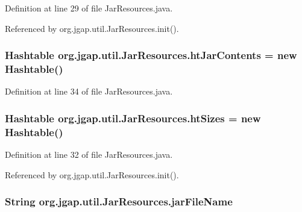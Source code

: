 Definition at line 29 of file Jar\-Resources.\-java.



Referenced by org.\-jgap.\-util.\-Jar\-Resources.\-init().

\hypertarget{classorg_1_1jgap_1_1util_1_1_jar_resources_a49a4dfbb28f5a8d1ce4aebf4e2d93b84}{
\subsubsection[{ht\-Jar\-Contents}]{\setlength{\rightskip}{0pt plus 5cm}Hashtable org.\-jgap.\-util.\-Jar\-Resources.\-ht\-Jar\-Contents = new Hashtable()\hspace{0.3cm}{\ttfamily [private]}}}\label{classorg_1_1jgap_1_1util_1_1_jar_resources_a49a4dfbb28f5a8d1ce4aebf4e2d93b84}


Definition at line 34 of file Jar\-Resources.\-java.

\hypertarget{classorg_1_1jgap_1_1util_1_1_jar_resources_ac127982a8f4ee27585abfa736cb3fc03}{
\subsubsection[{ht\-Sizes}]{\setlength{\rightskip}{0pt plus 5cm}Hashtable org.\-jgap.\-util.\-Jar\-Resources.\-ht\-Sizes = new Hashtable()\hspace{0.3cm}{\ttfamily [private]}}}\label{classorg_1_1jgap_1_1util_1_1_jar_resources_ac127982a8f4ee27585abfa736cb3fc03}


Definition at line 32 of file Jar\-Resources.\-java.



Referenced by org.\-jgap.\-util.\-Jar\-Resources.\-init().

\hypertarget{classorg_1_1jgap_1_1util_1_1_jar_resources_a2ff183e8160357870aabbb7ff4f75000}{
\subsubsection[{jar\-File\-Name}]{\setlength{\rightskip}{0pt plus 5cm}String org.\-jgap.\-util.\-Jar\-Resources.\-jar\-File\-Name\hspace{0.3cm}{\ttfamily [private]}}}\label{classorg_1_1jgap_1_1util_1_1_jar_resources_a2ff183e8160357870aabbb7ff4f75000}


